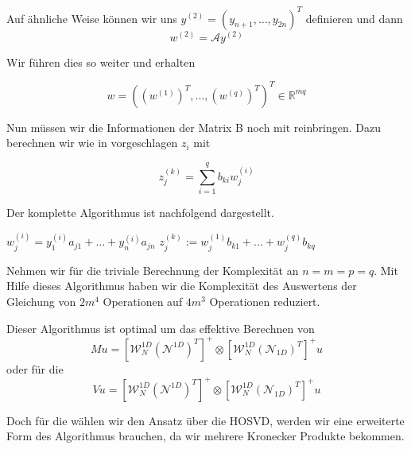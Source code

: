 Auf ähnliche Weise können wir uns $y^{(2)}=(y_{n+1},\dots,y_{2n})^{T}$ definieren und dann
\begin{equation*}
w^{(2)} = \mathcal{A}y^{(2)}
\end{equation*}

Wir führen dies so weiter und erhalten

\begin{equation*}
w=( (w^{(1)})^T , \dots, (w^{(q)})^T)^T \in \mathbb{R}^{mq}
\end{equation*}

Nun müssen wir die Informationen der Matrix B noch mit reinbringen. Dazu berechnen wir wie in \cite{Teachlet} vorgeschlagen $z_i$ mit

\begin{equation*}
z^{(k)}_j = \sum_{i=1}^{q} b_{ki} w_j^{(i)}
\end{equation*}

Der komplette Algorithmus ist nachfolgend dargestellt.
\begin{mdframed}[backgroundcolor=blue!3] 
\begin{algorithmic}
			\State $w^{(i)}_{j} = y^{(i)}_1 a_{j1} + \dots + y^{(i)}_n a_{jn}$
	\EndFor
\EndFor
{}
			\State $z^{(k)}_j := w^{(1)}_j b_{k1} + \dots + w^{(q)}_j b_{kq}$
	\EndFor
\EndFor

\end{algorithmic}
\end{mdframed}


Nehmen wir für die triviale Berechnung der Komplexität an $n=m=p=q$.
Mit Hilfe dieses Algorithmus haben wir die Komplexität des Auswertens der Gleichung von $2m^4$ Operationen auf $4m^3$ Operationen reduziert.

Dieser Algorithmus ist optimal um das effektive Berechnen von
\begin{equation*}
Mu=[\mathcal{W}_N^{1D} (\mathcal{N}^{1D})^T]^+ \otimes [\mathcal{W}_N^{1D} (\mathcal{N}_{1D})^T]^+ u
\end{equation*}
oder für die 
\begin{equation*}
Vu=[\mathcal{W}_N^{1D} (\mathcal{N}^{1D})^T]^+ \otimes [\mathcal{W}_N^{1D} (\mathcal{N}_{1D})^T]^+ u
\end{equation*}

Doch für die wählen wir den Ansatz über die HOSVD,  werden wir eine erweiterte Form des Algorithmus brauchen, da wir mehrere Kronecker Produkte bekommen.




